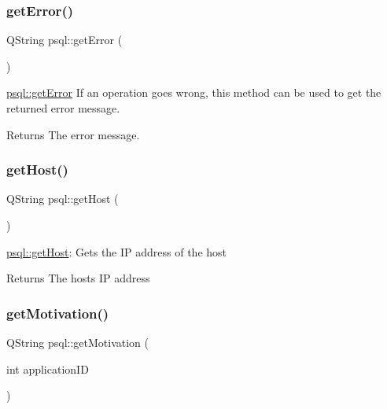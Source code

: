 \subsubsection{\texorpdfstring{get\+Error()}{getError()}}
{\footnotesize\ttfamily Q\+String psql\+::get\+Error (\begin{DoxyParamCaption}{ }\end{DoxyParamCaption})}



\hyperlink{classpsql_a5f51e254b67ff932f287df2184ccc043}{psql\+::get\+Error} If an operation goes wrong, this method can be used to get the returned error message. 

\begin{DoxyReturn}{Returns}
The error message. 
\end{DoxyReturn}
\mbox{\label{classpsql_a95d06ee661db0b9cf72605b983b04613}} 
\subsubsection{\texorpdfstring{get\+Host()}{getHost()}}
{\footnotesize\ttfamily Q\+String psql\+::get\+Host (\begin{DoxyParamCaption}{ }\end{DoxyParamCaption})}



\hyperlink{classpsql_a95d06ee661db0b9cf72605b983b04613}{psql\+::get\+Host}\+: Gets the IP address of the host 

\begin{DoxyReturn}{Returns}
The host\textquotesingle{}s IP address 
\end{DoxyReturn}
\mbox{\label{classpsql_aca1b2273937491e113089c1547caf49b}} 
\subsubsection{\texorpdfstring{get\+Motivation()}{getMotivation()}}
{\footnotesize\ttfamily Q\+String psql\+::get\+Motivation (\begin{DoxyParamCaption}\item[{int}]{application\+ID }\end{DoxyParamCaption})}



